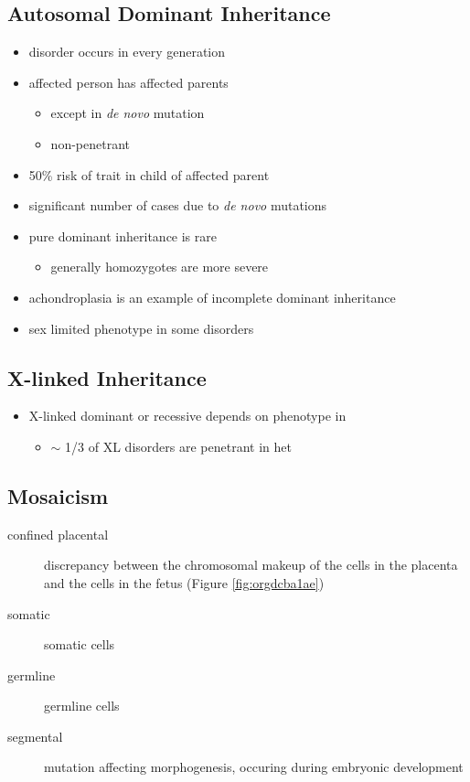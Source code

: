 \documentclass[12pt]{scrartcl}
\begin{document}
\subsection{Autosomal Dominant Inheritance}
\label{sec:org8ed42a5}
\begin{itemize}
\item disorder occurs in every generation
\item affected person has affected parents
\begin{itemize}
\item except in \emph{de novo} mutation
\item non-penetrant
\end{itemize}
\item 50\% risk of trait in child of affected parent
\item significant number of cases due to \emph{de novo} mutations

\item pure dominant inheritance is rare
\begin{itemize}
\item generally homozygotes are more severe
\end{itemize}
\item achondroplasia is an example of incomplete dominant inheritance
\item sex limited phenotype in some disorders
\end{itemize}

\subsection{X-linked Inheritance}
\label{sec:org1ebabc3}
\begin{itemize}
\item X-linked dominant or recessive depends on phenotype in \female
\begin{itemize}
\item \(\sim\) 1/3 of XL disorders are penetrant in het \female
\end{itemize}
\end{itemize}

\subsection{Mosaicism}
\label{sec:org932943d}
\begin{description}
\item[{confined placental}] discrepancy between the chromosomal makeup of
the cells in the placenta and the cells in the fetus (Figure \ref{fig:orgdcba1ae})
\item[{somatic}] somatic cells
\item[{germline}] germline cells
\item[{segmental}] mutation affecting morphogenesis, occuring during
embryonic development
\end{description}
\end{document}
